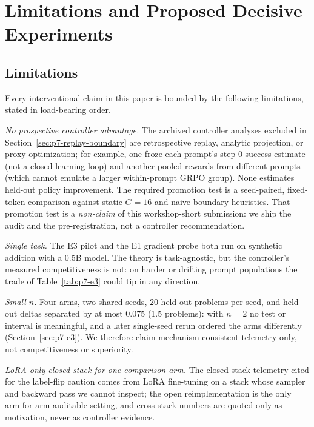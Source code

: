 \section{Limitations and Proposed Decisive Experiments}
\label{sec:p7-limitations}

\subsection{Limitations}
\label{sec:p7-limitations-list}
Every interventional claim in this paper is bounded by the following
limitations, stated in load-bearing order.

\emph{No prospective controller advantage.} The archived controller analyses
excluded in Section~\ref{sec:p7-replay-boundary} are retrospective replay,
analytic projection, or proxy optimization; for example, one froze each
prompt's step-0 success estimate (not a closed learning loop) and another
pooled rewards from different prompts (which cannot emulate a larger
within-prompt GRPO group). None estimates held-out policy improvement. The required promotion test is a seed-paired, fixed-token comparison
against static $G{=}16$ and naive boundary heuristics.
That promotion test is a \emph{non-claim} of this workshop-short submission:
we ship the audit and the pre-registration, not a controller recommendation.

\emph{Single task.} The E3 pilot and the E1 gradient probe both run on
synthetic addition with a 0.5B model. The theory
is task-agnostic, but the controller's measured competitiveness is not: on
harder or drifting prompt populations the trade of
Table~\ref{tab:p7-e3} could tip in any direction.

\emph{Small $n$.} Four arms, two shared seeds, 20 held-out problems per
seed, and held-out deltas separated by at most $0.075$ (1.5 problems): with
$n{=}2$ no test or interval is meaningful, and a later single-seed rerun
ordered the arms differently (Section~\ref{sec:p7-e3}). We therefore claim
mechanism-consistent telemetry only, not competitiveness or superiority.

\emph{LoRA-only closed stack for one comparison arm.} The closed-stack
telemetry cited for the label-flip caution comes from LoRA
\citep{hu2022lora} fine-tuning on a stack whose sampler and backward pass we
cannot inspect; the open reimplementation is the only arm-for-arm auditable
setting, and cross-stack numbers are quoted only as motivation, never as
controller evidence.

